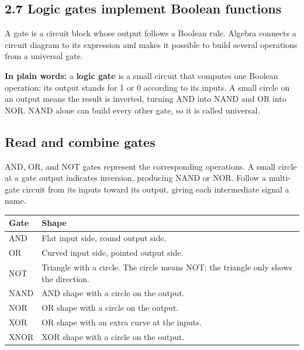 \documentclass[11pt]{article}
\begin{document}
\begin{keepsection}
\section{2.7 Logic gates implement Boolean functions}

A gate is a circuit block whose output follows a Boolean rule. Algebra connects a circuit diagram to its expression and makes it possible to build several operations from a universal gate.

\begin{plainbox}\textbf{In plain words:} a \textbf{logic gate} is a small circuit that computes one Boolean operation; its output stands for 1 or 0 according to its inputs. A small circle on an output means the result is inverted, turning AND into NAND and OR into NOR. NAND alone can build every other gate, so it is called universal.\end{plainbox}

\begin{keepsection}
\subsection{Read and combine gates}

AND, OR, and NOT gates represent the corresponding operations. A small circle at a gate output indicates inversion, producing NAND or NOR. Follow a multi-gate circuit from its inputs toward its output, giving each intermediate signal a name.

\begin{center}\small\begin{tabularx}{\linewidth}{>{\raggedright\arraybackslash}X>{\raggedright\arraybackslash}X}\toprule
\textbf{Gate} & \textbf{Shape} \\ \midrule
 AND & Flat input side, round output side. \\
 OR & Curved input side, pointed output side. \\
 NOT & Triangle with a circle. The circle means NOT; the triangle only shows the direction. \\
 NAND & AND shape with a circle on the output. \\
 NOR & OR shape with a circle on the output. \\
 XOR & OR shape with an extra curve at the inputs. \\
 XNOR & XOR shape with a circle on the output. \\
\bottomrule\end{tabularx}\end{center}


\end{keepsection}
\end{keepsection}
\end{document}
